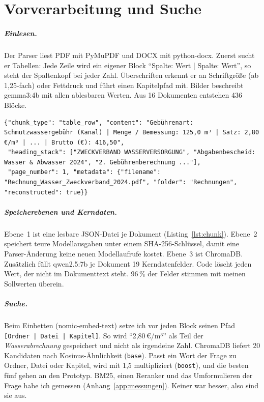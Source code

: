 
\chapter{Vorverarbeitung und Suche}
\label{chap:vorverarbeitung}

\paragraph{Einlesen.} Der Parser liest PDF mit PyMuPDF und DOCX mit python-docx. Zuerst sucht er Tabellen: Jede Zeile wird ein eigener Block \enquote{Spalte: Wert | Spalte: Wert}, so steht der Spaltenkopf bei jeder Zahl. Überschriften erkennt er an Schriftgröße (ab 1,25-fach) oder Fettdruck und führt einen Kapitelpfad mit. Bilder beschreibt gemma3:4b mit allen ablesbaren Werten. Aus 16 Dokumenten entstehen 436 Blöcke.

\begin{lstlisting}[language={}, basicstyle=\ttfamily\scriptsize, caption={Eine Tabellenzeile im JSON-Zwischenformat (gekürzt)}, label=lst:chunk, frame=single, breaklines=true]
{"chunk_type": "table_row", "content": "Gebührenart: Schmutzwassergebühr (Kanal) | Menge / Bemessung: 125,0 m³ | Satz: 2,80 €/m³ | ... | Brutto (€): 416,50",
 "heading_stack": ["ZWECKVERBAND WASSERVERSORGUNG", "Abgabenbescheid: Wasser & Abwasser 2024", "2. Gebührenberechnung ..."],
 "page_number": 1, "metadata": {"filename": "Rechnung_Wasser_Zweckverband_2024.pdf", "folder": "Rechnungen", "reconstructed": true}}
\end{lstlisting}

\paragraph{Speicherebenen und Kerndaten.} Ebene~1 ist eine lesbare JSON-Datei je Dokument (Listing~\ref{lst:chunk}). Ebene~2 speichert teure Modellausgaben unter einem SHA-256-Schlüssel, damit eine Parser-Änderung keine neuen Modellaufrufe kostet. Ebene~3 ist ChromaDB. Zusätzlich füllt qwen2.5:7b je Dokument 19 Kerndatenfelder. Code löscht jeden Wert, der nicht im Dokumenttext steht. 96\,\% der Felder stimmen mit meinen Sollwerten überein.

\paragraph{Suche.} Beim Einbetten (nomic-embed-text) setze ich vor jeden Block seinen Pfad \texttt{[Ordner | Datei | Kapitel]}. So wird \enquote{2,80\,€/m³} als Teil der \emph{Wasserabrechnung} gespeichert und nicht als irgendeine Zahl. ChromaDB liefert 20 Kandidaten nach Kosinus-Ähnlichkeit (\texttt{base}). Passt ein Wort der Frage zu Ordner, Datei oder Kapitel, wird mit 1,5 multipliziert (\texttt{boost}), und die besten fünf gehen an den Prototyp. BM25, einen Reranker und das Umformulieren der Frage habe ich gemessen (Anhang~\ref{app:messungen}). Keiner war besser, also sind sie aus.
